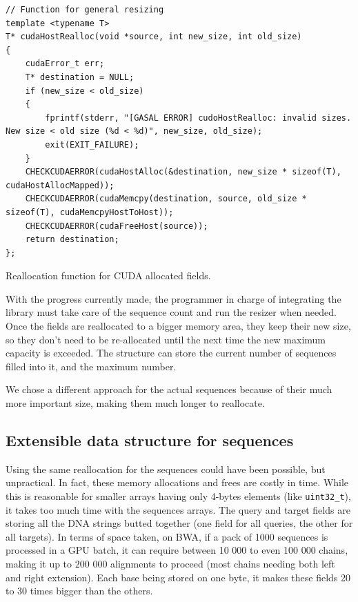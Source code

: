 \begin{listing}[h!]
	\begin{verbatim}
// Function for general resizing
template <typename T>
T* cudaHostRealloc(void *source, int new_size, int old_size) 
{
	cudaError_t err;
	T* destination = NULL;
	if (new_size < old_size)
	{
		fprintf(stderr, "[GASAL ERROR] cudoHostRealloc: invalid sizes. New size < old size (%d < %d)", new_size, old_size);
		exit(EXIT_FAILURE);
	}
	CHECKCUDAERROR(cudaHostAlloc(&destination, new_size * sizeof(T), cudaHostAllocMapped));
	CHECKCUDAERROR(cudaMemcpy(destination, source, old_size * sizeof(T), cudaMemcpyHostToHost));
	CHECKCUDAERROR(cudaFreeHost(source));
	return destination;
};
	\end{verbatim}
	\caption{Reallocation function for CUDA allocated fields.}
	\label{lst:cudarealloc}
\end{listing}

With the progress currently made, the programmer in charge of integrating the library must take care of the sequence count and run the resizer when needed. Once the fields are reallocated to a bigger memory area, they keep their new size, so they don't need to be re-allocated until the next time the new maximum capacity is exceeded. The structure can store the current number of sequences filled into it, and the maximum number. 

We chose a different approach for the actual sequences because of their much more important size, making them much longer to reallocate.

\subsection{Extensible data structure for sequences}

Using the same reallocation for the sequences could have been possible, but unpractical. In fact, these memory allocations and frees are costly in time. While this is reasonable for smaller arrays having only 4-bytes elements (like \verb|uint32_t|), it takes too much time with the sequences arrays. The query and target fields are storing all the DNA strings butted together (one field for all queries, the other for all targets). In terms of space taken, on BWA, if a pack of 1000 sequences is processed in a GPU batch, it can require between 10 000 to even 100 000 chains, making it up to 200 000 alignments to proceed (most chains needing both left and right extension). Each base being stored on one byte, it makes these fields 20 to 30 times bigger than the others.

